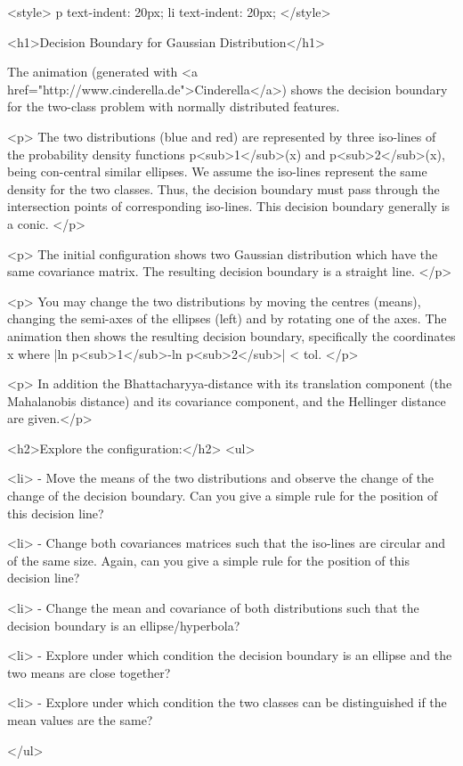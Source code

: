 <style>
p {
  text-indent: 20px;
}
li {
  text-indent: 20px;
}
</style>


<h1>Decision Boundary for Gaussian Distribution</h1> 


The animation (generated with <a
    href="http://www.cinderella.de">Cinderella</a>) shows the decision boundary for the two-class problem with normally distributed features.
    
<p>    The two distributions (blue and red) are represented by three iso-lines of the probability density functions p<sub>1</sub>(x) and p<sub>2</sub>(x), being con-central similar ellipses. We assume the iso-lines represent the same density for the two classes. Thus, the decision boundary must pass through the intersection points of corresponding iso-lines. This decision boundary generally is a conic. </p>
    

<p>    The initial configuration shows two Gaussian distribution which have the same covariance matrix. The resulting decision boundary is a straight line. </p>    
    
<p>    You may change the two distributions by moving the centres (means), changing the semi-axes of the ellipses (left) and by rotating one of the axes. The animation then shows the resulting decision boundary, specifically the coordinates x where |ln p<sub>1</sub>-ln p<sub>2</sub>| < tol. </p>

<p>   In addition the Bhattacharyya-distance with its translation component (the Mahalanobis distance) and its covariance component, and the Hellinger distance are given.</p>
    
    
    

    <h2>Explore the configuration:</h2>
    <ul>

      <li> - Move the means of the two distributions and observe the change of the change of the 
      decision boundary. Can you give a simple rule for the position of this decision line?
 			
 			<li> - Change both covariances matrices such that the iso-lines are circular and of the 
 			same size. Again, can you give a simple rule for the position of this decision line?
 			
 			<li> - Change the mean and covariance of both distributions such that the decision 
 			boundary is an ellipse/hyperbola?  
 			
	    <li> - Explore under which condition the decision boundary is an ellipse and the two means 
	    are close together?
	    
	    <li> - Explore under which condition the two classes can be distinguished if the mean 
	    values are the same?
	    
	   
    </ul>
